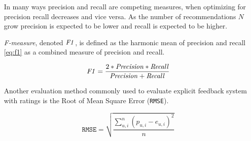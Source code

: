 In many ways precision and recall are competing measures, when optimizing for precision recall decreases and vice versa.  As the number of recommendations $N$ grow precision is expected to be lower and recall is expected to be higher. \citep{hu2008collaborative}


\textit{F-measure}, denoted $\mathit{F1}$, is defined as the harmonic mean of precision and recall \eqref{eq:f1} as a combined measure of precision and recall.

\begin{equation} \label{eq:f1}
    \mathit{F1} = \frac{2 * \mathit{Precision} * \mathit{Recall}}{\mathit{Precision} + \mathit{Recall}}
\end{equation}

Another evaluation method commonly used to evaluate explicit feedback system with ratings is the Root of Mean Square Error (\texttt{RMSE}).
\citep{bobadilla2013recommender}

\begin{equation} \label{eq:rmse}
    \mathtt{RMSE} = \sqrt{\frac{\sum_{u, i}^n (p_{u, i} - e_{u, i})^2}{n}}
\end{equation}

